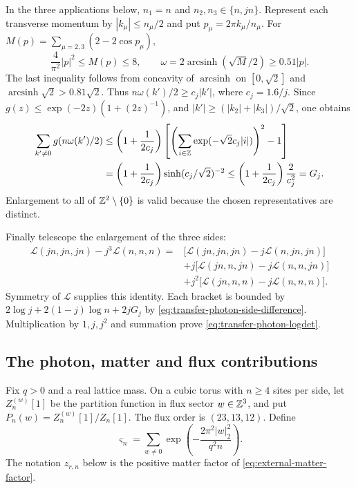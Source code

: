 In the three applications below, $n_1=n$ and
$n_2,n_3\in\{n,jn\}$. Represent each transverse momentum by
$|k_\mu|\le n_\mu/2$ and put $p_\mu=2\pi k_\mu/n_\mu$.
For
$M(p)=\sum_{\mu=2,3}(2-2\cos p_\mu)$,
\[
 \frac4{\pi^2}|p|^2\le M(p)\le8,\qquad
 \omega=2\operatorname{arcsinh}(\sqrt M/2)\ge0.51|p|.
\]
The last inequality follows from concavity of
$\operatorname{arcsinh}$ on $[0,\sqrt2]$ and
$\operatorname{arcsinh}\sqrt2>0.81\sqrt2$.
Thus $n\omega(k')/2\ge c_j|k'|$, where $c_j=1.6/j$.
Since
$g(z)\le\exp(-2z)(1+(2z)^{-1})$, and
$|k'|\ge(|k_2|+|k_3|)/\sqrt2$, one obtains
\begin{align*}
 \sum_{k'\ne0}g(n\omega(k')/2)
 &\le\left(1+\frac1{2c_j}\right)
   \left[
     \left(\sum_{i\in\mathbb Z}\exp(-\sqrt2c_j|i|)\right)^2-1
   \right]\\
 &=\left(1+\frac1{2c_j}\right)
                  \sinh(c_j/\sqrt2)^{-2}
 \le\left(1+\frac1{2c_j}\right)\frac2{c_j^2}
 =G_j.
\end{align*}
Enlargement to all of $\mathbb Z^2\setminus\{0\}$ is valid because
the chosen representatives are distinct.

Finally telescope the enlargement of the three sides:
\begin{align*}
 \mathcal L(jn,jn,jn)-j^3\mathcal L(n,n,n)
 ={}&\bigl[\mathcal L(jn,jn,jn)-j\mathcal L(n,jn,jn)\bigr]\\
 &+j\bigl[\mathcal L(jn,n,jn)-j\mathcal L(n,n,jn)\bigr]\\
 &+j^2\bigl[\mathcal L(jn,n,n)-j\mathcal L(n,n,n)\bigr].
\end{align*}
Symmetry of $\mathcal L$ supplies this identity.
Each bracket is bounded by
$2\log j+2(1-j)\log n+2jG_j$ by
\eqref{eq:transfer-photon-side-difference}.
Multiplication by $1,j,j^2$ and summation prove
\eqref{eq:transfer-photon-logdet}.

\subsection{The photon, matter and flux contributions}

Fix $q>0$ and a real lattice mass. On a cubic torus with
$n\ge4$ sites per side, let $Z_n^{(w)}[1]$ be the
partition function in flux sector $w\in\mathbb Z^3$, and put
$P_n(w)=Z_n^{(w)}[1]/Z_n[1]$. The flux order is
$(23,13,12)$. Define
\begin{equation}\label{eq:transfer-flux-tail}
 \varsigma_n=\sum_{w\ne0}
              \exp\left(-\frac{2\pi^2|w|_2^2}{q^2n}\right).
\end{equation}
The notation $z_{r,n}$ below is the positive matter factor
of \eqref{eq:external-matter-factor}.


